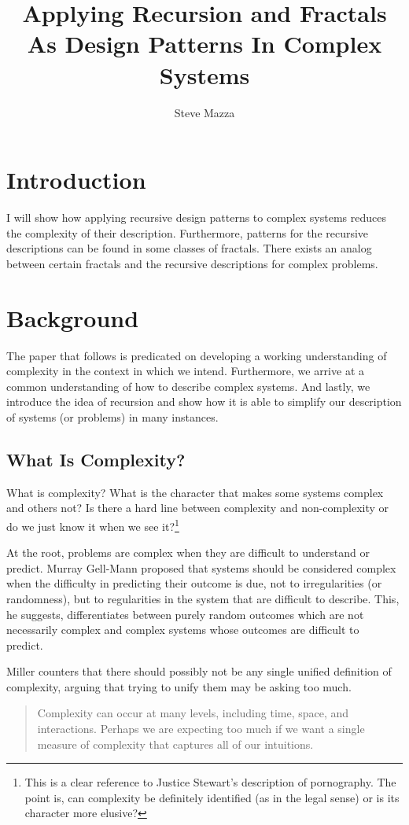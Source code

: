 \documentclass[jou,apacite]{apa6}
\title{Applying Recursion and Fractals As Design Patterns In Complex Systems}
\author{Steve Mazza}
\affiliation{Naval Postgraduate School}
\begin{document}
\maketitle    
                        
\section{Introduction}  %
I will show how applying recursive design patterns to complex systems reduces the complexity of their description.  Furthermore, patterns for the recursive descriptions can be found in some classes of fractals.  There exists an analog between certain fractals and the recursive descriptions for complex problems.

\section{Background}  %
The paper that follows is predicated on developing a working understanding of complexity in the context in which we intend.  Furthermore, we arrive at a common understanding of how to describe complex systems.  And lastly, we introduce the idea of recursion and show how it is able to simplify our description of systems (or problems) in many instances.

\subsection{What Is Complexity?}  %
What is complexity?  What is the character that makes some systems complex and others not?  Is there a hard line between complexity and non-complexity or do we just know it when we see it?\footnote{This is a clear reference to Justice Stewart's description of pornography.  The point is, can complexity be definitely identified (as in the legal sense) or is its character more elusive?}

At the root, problems are complex when they are difficult to understand or predict.  Murray Gell-Mann proposed that systems should be considered complex when the difficulty in predicting their outcome is due, not to irregularities (or randomness), but to regularities in the system that are difficult to describe.  This, he suggests, differentiates between purely random outcomes which are not necessarily complex and complex systems whose outcomes are difficult to
predict.~\cite{GellMann}

Miller counters that there should possibly not be any single unified definition of complexity, arguing that trying to unify them may be asking too much.
\begin{quotation}
  Complexity can occur at many levels, including time, space, and interactions.  Perhaps we are expecting too much if we want a single measure of complexity that captures all of our intuitions.~\cite[page 234]{Miller}
\end{quotation}
\end{document}
